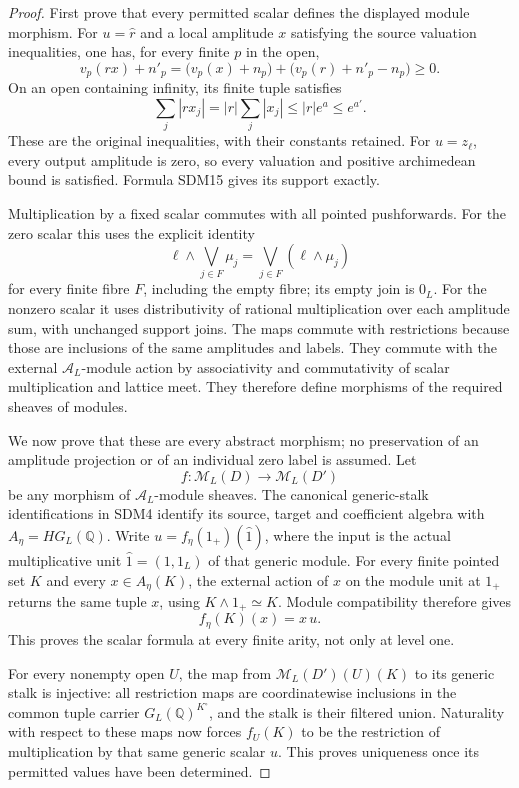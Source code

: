 \begin{proof}
First prove that every permitted scalar defines the displayed module
morphism. For $u=\widehat r$ and a local amplitude $x$ satisfying
the source valuation inequalities, one has, for every finite $p$
in the open,
\[
v_p(rx)+n'_p
 =\bigl(v_p(x)+n_p\bigr)
  +\bigl(v_p(r)+n'_p-n_p\bigr)\ge0.
\]
On an open containing infinity, its finite tuple satisfies
\[
\sum_j|rx_j|=|r|\sum_j|x_j|
 \le |r|e^a\le e^{a'}.
\]
These are the original inequalities, with their constants retained.
For $u=z_\ell$, every output amplitude is zero, so every valuation
and positive archimedean bound is satisfied. Formula SDM15 gives its
support exactly.

Multiplication by a fixed scalar commutes with all pointed
pushforwards. For the zero scalar this uses the explicit identity
\[
\ell\wedge\bigvee_{j\in F}\mu_j
 =\bigvee_{j\in F}(\ell\wedge\mu_j)
\]
for every finite fibre $F$, including the empty fibre; its empty
join is $0_L$. For the nonzero scalar it uses distributivity of
rational multiplication over each amplitude sum, with unchanged
support joins. The maps commute with restrictions because those
are inclusions of the same amplitudes and labels. They commute
with the external $\mathcal A_L$-module action by associativity
and commutativity of scalar multiplication and lattice meet.
They therefore define morphisms of the required sheaves of modules.

We now prove that these are every abstract morphism; no preservation
of an amplitude projection or of an individual zero label is assumed.
Let
\[
f:\mathcal M_L(D)\longrightarrow\mathcal M_L(D')
\]
be any morphism of $\mathcal A_L$-module sheaves. The canonical
generic-stalk identifications in SDM4 identify its source, target
and coefficient algebra with
$A_\eta=HG_L(\mathbb Q)$. Write
$u=f_\eta(1_+)(\widehat1)$, where the input is the actual
multiplicative unit $\widehat1=(1,1_L)$ of that generic module.
For every finite pointed set $K$ and every
$x\in A_\eta(K)$, the external action of $x$ on the module
unit at $1_+$ returns the same tuple $x$, using
$K\wedge1_+\simeq K$. Module compatibility therefore gives
\[
f_\eta(K)(x)=x\,u.
\]
This proves the scalar formula at every finite arity, not only
at level one.

For every nonempty open $U$, the map from
$\mathcal M_L(D')(U)(K)$ to its generic stalk is injective:
all restriction maps are coordinatewise inclusions in the common
tuple carrier $G_L(\mathbb Q)^{K^\circ}$, and the stalk is their
filtered union. Naturality with respect to these maps now forces
$f_U(K)$ to be the restriction of multiplication by that same
generic scalar $u$. This proves uniqueness once its permitted
values have been determined.


\end{proof}
